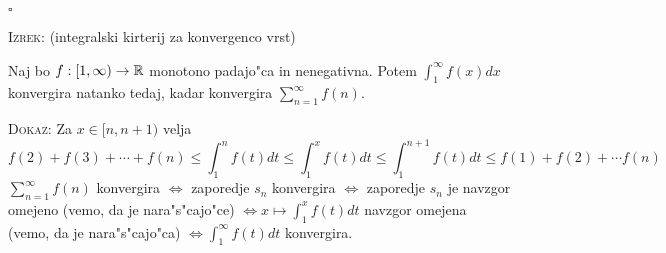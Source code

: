 \hfill $\square$

\textsc{Izrek:} (integralski kirterij za konvergenco vrst)

Naj bo $f: [1, \infty) \to \mathbb{R}$ monotono padajo"ca in nenegativna. Potem $\int_1^\infty f(x) dx$ konvergira natanko tedaj, kadar konvergira $\sum_{n =1}^\infty f(n)$.

\textsc{Dokaz:} Za $x \in [n, n+1)$ velja
\begin{equation*}
f(2) + f(3) + \cdots + f(n) \leq \int_1^n f(t) dt \leq \int_1^x f(t) dt \leq \int_1^{n+1} f(t) dt \leq f(1) + f(2) + \cdots f(n)
\end{equation*}
$\sum_{n=1}^{\infty} f(n)$ konvergira $\iff$ zaporedje $s_n$ konvergira $\iff$ zaporedje $s_n$ je navzgor omejeno (vemo, da je nara"s"cajo"ce) $\iff x \mapsto \int_1^x f(t) dt$ navzgor omejena (vemo, da je nara"s"cajo"ca) $\iff \int_1^\infty f(t) dt$ konvergira.
%
